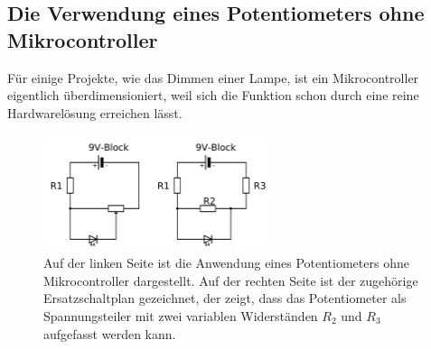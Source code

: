 \subsection{Die Verwendung eines Potentiometers ohne Mikrocontroller}

Für einige Projekte, wie das Dimmen einer Lampe, ist ein Mikrocontroller eigentlich überdimensioniert, weil sich die Funktion schon durch eine reine Hardwarelösung erreichen lässt.

\begin{figure}[H]
	\centering
	\includegraphics[width=0.6\textwidth]{./Zeichnungen/potentiometer-anwendung.png}
	\caption{Auf der linken Seite ist die Anwendung eines Potentiometers ohne Mikrocontroller dargestellt. Auf der rechten Seite ist der zugehörige Ersatzschaltplan gezeichnet, der zeigt, dass das Potentiometer als Spannungsteiler mit zwei variablen Widerständen $R_2$ und $R_3$ aufgefasst werden kann.}
\end{figure}

